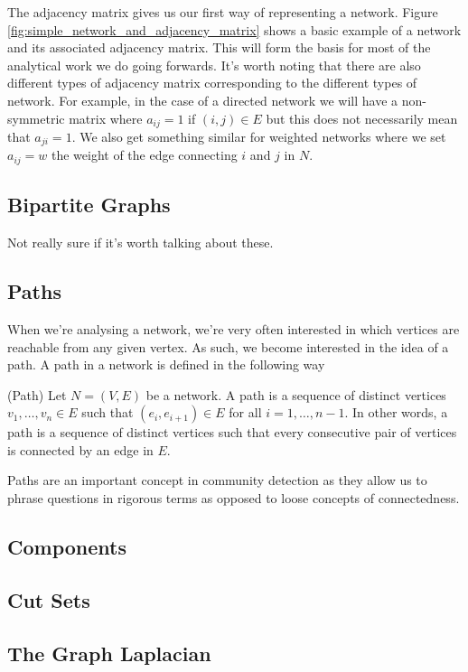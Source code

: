 The adjacency matrix gives us our first way of representing a network. Figure \ref{fig:simple_network_and_adjacency_matrix} shows a basic example of a network and its associated adjacency matrix. This will form the basis for most of the analytical work we do going forwards. It's worth noting that there are also different types of adjacency matrix corresponding to the different types of network. For example, in the case of a directed network we will have a non-symmetric matrix where $a_{ij} = 1$ if $(i, j) \in E$ but this does not necessarily mean that $a_{ji} = 1$. We also get something similar for weighted networks where we set $a_{ij} = w$ the weight of the edge connecting $i$ and $j$ in $N$.

\subsection{Bipartite Graphs}
Not really sure if it's worth talking about these.

\subsection{Paths}
When we're analysing a network, we're very often interested in which vertices are reachable from any given vertex. As such, we become interested in the idea of a path. A path in a network is defined in the following way

\begin{definition}{(Path)}
    Let $N = (V, E)$ be a network. A path is a sequence of distinct vertices $v_1, \dots, v_n \in E$ such that $(e_i, e_{i+1}) \in E$ for all $i = 1, \dots, n-1$. In other words, a path is a sequence of distinct vertices such that every consecutive pair of vertices is connected by an edge in $E$.
\end{definition}

Paths are an important concept in community detection as they allow us to phrase questions in rigorous terms as opposed to loose concepts of connectedness.

\subsection{Components}

\subsection{Cut Sets}

\subsection{The Graph Laplacian}

